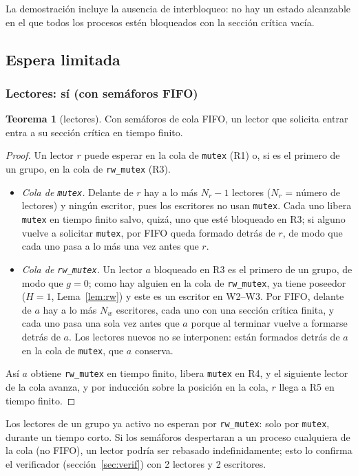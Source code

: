 \documentclass[12pt,letterpaper]{article}
\theoremstyle{definition}
\newtheorem{teorema}{Teorema}
\newcommand{\sem}[1]{\texttt{#1}}
\begin{document}
La demostración incluye la ausencia de interbloqueo: no hay un estado alcanzable en el que todos los procesos estén bloqueados con la sección crítica vacía.

\subsection{Espera limitada}\label{sec:espera}
\subsubsection*{Lectores: sí (con semáforos FIFO)}
\begin{teorema}[lectores]\label{teo:lect}
Con semáforos de cola FIFO, un lector que solicita entrar entra a su sección crítica en tiempo finito.
\end{teorema}
\begin{proof}
Un lector $r$ puede esperar en la cola de \sem{mutex} (R1) o, si es el primero de un grupo, en la cola de \sem{rw\_mutex} (R3).
\begin{itemize}[itemsep=2pt]
\item \emph{Cola de \sem{mutex}.} Delante de $r$ hay a lo más $N_r - 1$ lectores ($N_r$ = número de lectores) y ningún escritor, pues los escritores no usan \sem{mutex}. Cada uno libera \sem{mutex} en tiempo finito salvo, quizá, uno que esté bloqueado en R3; si alguno vuelve a solicitar \sem{mutex}, por FIFO queda formado detrás de $r$, de modo que cada uno pasa a lo más una vez antes que $r$.
\item \emph{Cola de \sem{rw\_mutex}.} Un lector $a$ bloqueado en R3 es el primero de un grupo, de modo que $g=0$; como hay alguien en la cola de \sem{rw\_mutex}, ya tiene poseedor ($H=1$, Lema~\ref{lem:rw}) y este es un escritor en W2--W3. Por FIFO, delante de $a$ hay a lo más $N_w$ escritores, cada uno con una sección crítica finita, y cada uno pasa una sola vez antes que $a$ porque al terminar vuelve a formarse detrás de $a$. Los lectores nuevos no se interponen: están formados detrás de $a$ en la cola de \sem{mutex}, que $a$ conserva.
\end{itemize}
Así $a$ obtiene \sem{rw\_mutex} en tiempo finito, libera \sem{mutex} en R4, y el siguiente lector de la cola avanza, y por inducción sobre la posición en la cola, $r$ llega a R5 en tiempo finito. \qedhere
\end{proof}
Los lectores de un grupo ya activo no esperan por \sem{rw\_mutex}: solo por \sem{mutex}, durante un tiempo corto. Si los semáforos despertaran a un proceso cualquiera de la cola (no FIFO), un lector podría ser rebasado indefinidamente; esto lo confirma el verificador (sección~\ref{sec:verif}) con 2 lectores y 2 escritores.
\end{document}
